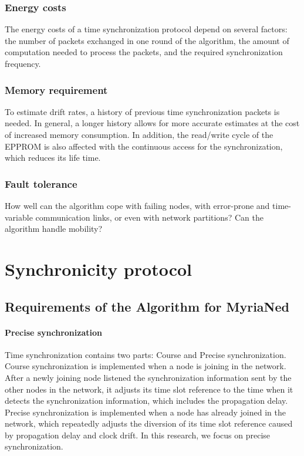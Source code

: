 \documentclass[a4paper,10pt]{report}
\begin{document}
\subsection{\textbf{Energy costs}}
The energy costs of a time synchronization protocol depend on several factors: the number of packets exchanged in one round of the algorithm, the amount of computation needed to process the packets, and the required synchronization frequency.
\subsection{\textbf{Memory requirement}}
To estimate drift rates, a history of previous time synchronization packets is needed. In general, a longer history allows for more accurate estimates at the cost of increased memory consumption. In addition, the read/write cycle of the EPPROM is also affected with the continuous access for the synchronization, which reduces its life time.
\subsection{\textbf{Fault tolerance}}
How well can the algorithm cope with failing nodes, with error-prone and time-variable communication links, or even with network partitions? Can the algorithm handle mobility?
\chapter{\textbf{Synchronicity protocol}}
\section{\textbf{Requirements of the Algorithm for MyriaNed}}
\subsubsection{\textbf{Precise synchronization}}
Time synchronization contains two parts: Course and Precise synchronization. Course synchronization
is implemented when a node is joining in the network. After a newly joining node listened the synchronization information sent by
the other nodes in the network, it adjusts its time slot reference to the time when it detects the synchronization information, which includes the propagation delay. Precise synchronization is implemented when a node has already joined in the network, which repeatedly adjusts the diversion of its time slot reference caused by propagation delay and clock drift. In this research, we focus on precise synchronization.
\end{document}
